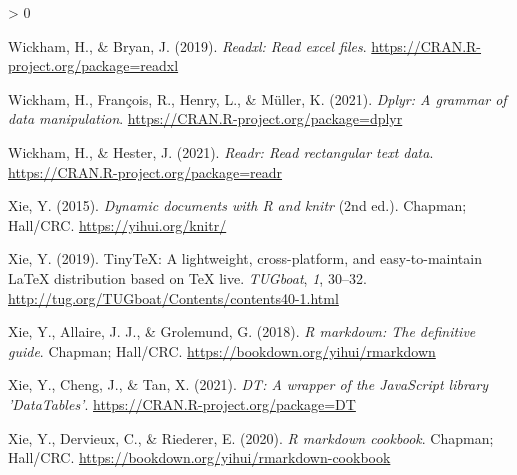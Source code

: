 \documentclass[
  english,
  man]{apa6}
\newlength{\cslhangindent}
\newenvironment{CSLReferences}[2] %
 {%
  \setlength{\parindent}{0pt}
  \ifodd #1 \everypar{\setlength{\hangindent}{\cslhangindent}}\ignorespaces\fi
  \ifnum #2 > 0
  \setlength{\parskip}{#2\baselineskip}
  \fi
 }%
 {}
\begin{document}
\begin{CSLReferences}{1}{0}
\leavevmode\hypertarget{ref-R-readxl}{}%
Wickham, H., \& Bryan, J. (2019). \emph{Readxl: Read excel files}. \url{https://CRAN.R-project.org/package=readxl}

\leavevmode\hypertarget{ref-R-dplyr}{}%
Wickham, H., François, R., Henry, L., \& Müller, K. (2021). \emph{Dplyr: A grammar of data manipulation}. \url{https://CRAN.R-project.org/package=dplyr}

\leavevmode\hypertarget{ref-R-readr}{}%
Wickham, H., \& Hester, J. (2021). \emph{Readr: Read rectangular text data}. \url{https://CRAN.R-project.org/package=readr}

\leavevmode\hypertarget{ref-R-knitr}{}%
Xie, Y. (2015). \emph{Dynamic documents with {R} and knitr} (2nd ed.). Chapman; Hall/CRC. \url{https://yihui.org/knitr/}

\leavevmode\hypertarget{ref-R-tinytex}{}%
Xie, Y. (2019). TinyTeX: A lightweight, cross-platform, and easy-to-maintain LaTeX distribution based on TeX live. \emph{TUGboat}, \emph{1}, 30--32. \url{http://tug.org/TUGboat/Contents/contents40-1.html}

\leavevmode\hypertarget{ref-R-rmarkdown_a}{}%
Xie, Y., Allaire, J. J., \& Grolemund, G. (2018). \emph{R markdown: The definitive guide}. Chapman; Hall/CRC. \url{https://bookdown.org/yihui/rmarkdown}

\leavevmode\hypertarget{ref-R-DT}{}%
Xie, Y., Cheng, J., \& Tan, X. (2021). \emph{DT: A wrapper of the JavaScript library 'DataTables'}. \url{https://CRAN.R-project.org/package=DT}

\leavevmode\hypertarget{ref-R-rmarkdown_b}{}%
Xie, Y., Dervieux, C., \& Riederer, E. (2020). \emph{R markdown cookbook}. Chapman; Hall/CRC. \url{https://bookdown.org/yihui/rmarkdown-cookbook}

\end{CSLReferences}

\endgroup
\end{document}
